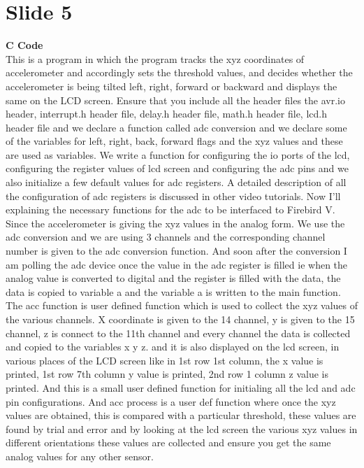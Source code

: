 \documentclass[a4paper,12 pt]{article}
\begin{document}
\section{Slide 5} 
\textbf{C Code}\\
This is a program in which the program tracks the xyz coordinates of accelerometer and accordingly sets the threshold values, and decides whether the accelerometer is being tilted left, right, forward or backward and displays the same on the LCD screen. Ensure that you include all the header files the avr.io header, interrupt.h header file, delay.h header file, math.h header file, lcd.h header file and we declare a function called adc conversion and we declare some of the variables for left, right, back, forward flags and the xyz values and these are used as variables. We write a function for configuring the io ports of the lcd, configuring the register values of lcd screen and configuring the adc pins and we also initialize a few default values for adc registers. A detailed description of all the configuration of adc registers is discussed in other video tutorials. Now I’ll explaining the necessary functions for the adc to be interfaced to Firebird V. Since the accelerometer is giving the xyz values in the analog form. We use the adc conversion and we are using 3 channels and the corresponding channel number is given to the adc conversion function. And soon after the conversion I am polling the adc device once the value in the adc register is filled ie when the analog value is converted to digital and the register is filled with the data, the data is copied to variable a and the variable a is written to the main function. The acc function is user defined function which is used to collect the xyz values of the various channels. X coordinate is given to the 14 channel, y is given to the 15 channel, z is connect to the 11th channel and every channel the data is collected and copied to the variables x y z. and it is also displayed on the lcd screen, in various places of the LCD screen like in 1st row 1st column, the x value is printed, 1st row 7th column y value is printed, 2nd row 1 column z value is printed. 
And this is a small user defined function for initialing all the lcd and adc pin configurations. And acc process is a user def function where once the xyz values are obtained, this is compared with a particular threshold, these values are found by trial and error and by looking at the lcd screen the various xyz values in different orientations these values are collected and ensure you get the same analog values for any other sensor.\\
\end{document}
